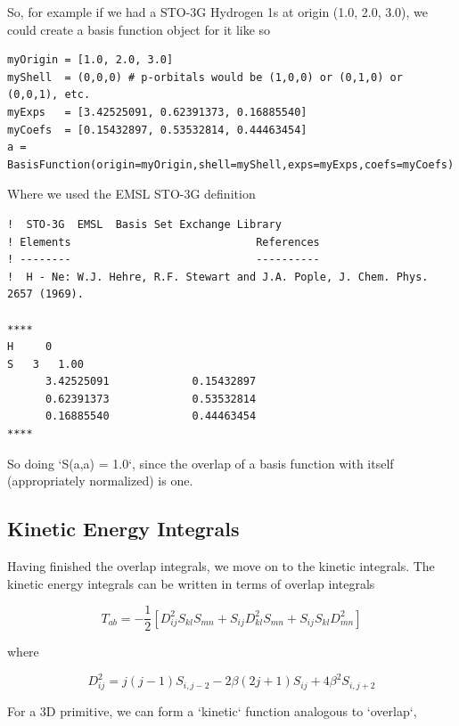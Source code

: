So, for example if we had a STO-3G Hydrogen 1s at origin (1.0, 2.0,
3.0), we could create a basis function object for it like so

\begin{lstlisting}[style=MyPython]
myOrigin = [1.0, 2.0, 3.0]
myShell  = (0,0,0) # p-orbitals would be (1,0,0) or (0,1,0) or (0,0,1), etc.
myExps   = [3.42525091, 0.62391373, 0.16885540] 
myCoefs  = [0.15432897, 0.53532814, 0.44463454]
a = BasisFunction(origin=myOrigin,shell=myShell,exps=myExps,coefs=myCoefs)
\end{lstlisting}

Where we used the EMSL STO-3G definition

\begin{lstlisting}
!  STO-3G  EMSL  Basis Set Exchange Library 
! Elements                             References
! --------                             ----------
!  H - Ne: W.J. Hehre, R.F. Stewart and J.A. Pople, J. Chem. Phys. 2657 (1969).

****
H     0 
S   3   1.00
      3.42525091             0.15432897       
      0.62391373             0.53532814       
      0.16885540             0.44463454       
****
\end{lstlisting}

So doing `S(a,a) = 1.0`, since the overlap of a basis function with
itself (appropriately normalized) is one.

\subsection{Kinetic Energy Integrals}

Having finished the overlap integrals, we move on to the kinetic
integrals. The kinetic energy integrals can be written in terms of
overlap integrals

\begin{equation}
  T_{ab} 
  = 
  -\frac{1}{2}\left[D_{ij}^2 S_{kl} S_{mn} + S_{ij}D_{kl}^2 S_{mn} + S_{ij} S_{kl} D_{mn}^2\right]
\end{equation}

where 

\begin{equation}
  D_{ij}^2 
  = 
  j(j-1)S_{i,j-2} - 2\beta(2j +1)S_{ij} + 4\beta^2 S_{i,j+2}
\end{equation}

For a 3D primitive, we can form a `kinetic` function analogous to
`overlap`,

